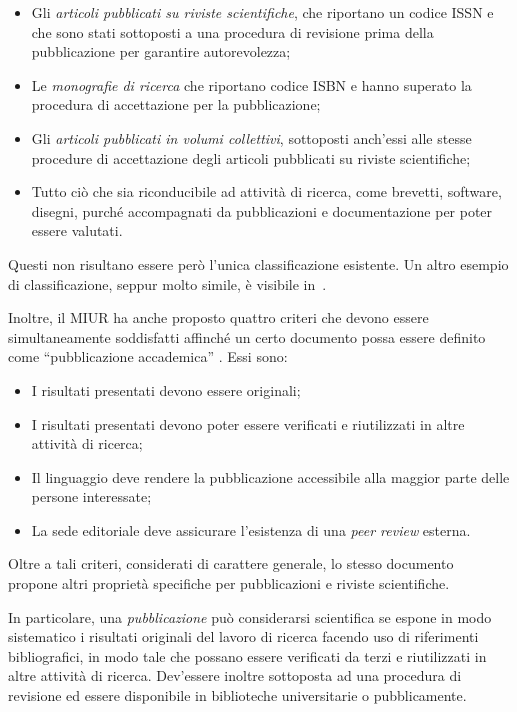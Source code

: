 \begin{itemize}
    \item Gli \textit{articoli pubblicati su riviste scientifiche}, che
    riportano un codice ISSN e che sono stati  sottoposti a una procedura di
    revisione prima della pubblicazione per garantire autorevolezza;
    \item Le \textit{monografie di ricerca} che riportano codice ISBN e hanno
    superato la procedura di  accettazione per la pubblicazione;
    \item Gli \textit{articoli pubblicati in volumi collettivi}, sottoposti
    anch'essi alle stesse procedure di  accettazione degli articoli pubblicati
    su riviste scientifiche;
    \item Tutto ciò che sia riconducibile ad attività di ricerca, come brevetti, software, disegni, 
    purché accompagnati da pubblicazioni e documentazione per poter essere valutati.
\end{itemize}
%
Questi non risultano essere però l'unica classificazione esistente. Un altro
esempio di classificazione, seppur molto simile, è visibile in~\cite{oechsner2013}.

Inoltre, il MIUR ha anche proposto quattro criteri che devono essere
simultaneamente soddisfatti affinché un certo documento possa essere definito
come ``pubblicazione accademica'' \cite{criteri2013pubblicazioni}.
Essi sono:

\begin{itemize}
    \item I risultati presentati devono essere originali;
    \item I risultati presentati devono poter essere verificati e riutilizzati
    in altre attività di ricerca;
    \item Il linguaggio deve rendere la pubblicazione accessibile alla maggior
    parte delle persone interessate;
    \item La sede editoriale deve assicurare l’esistenza di una \textit{peer review} esterna.
\end{itemize}

Oltre a tali criteri, considerati di carattere generale, lo stesso
documento~\cite{criteri2013pubblicazioni} propone altri proprietà specifiche per
pubblicazioni e riviste scientifiche.

In particolare, una \textit{pubblicazione} può considerarsi scientifica se
espone in modo sistematico i risultati originali del lavoro di ricerca facendo
uso di riferimenti bibliografici, in modo tale che possano essere verificati da
terzi e riutilizzati in altre attività di ricerca.
Dev'essere inoltre sottoposta ad una procedura di revisione ed essere disponibile
in biblioteche universitarie o pubblicamente.

